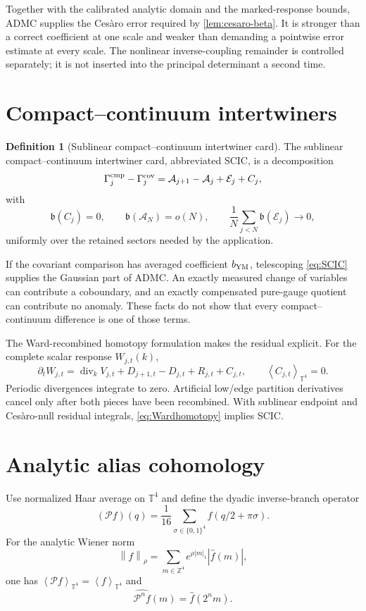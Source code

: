 \documentclass[11pt,oneside,openany]{book}
\theoremstyle{definition}
\newtheorem{definition}[definition]{Definition}
\theoremstyle{remark}
\newcommand{\Z}{\mathbb Z}
\newcommand{\T}{\mathbb T}
\newcommand{\norm}[1]{\left\lVert#1\right\rVert}
\newcommand{\avg}[1]{\left\langle#1\right\rangle_{\T^4}}
\newcommand{\src}[2]{\cite[#2]{#1}}
\begin{document}
Together with the calibrated analytic domain and the marked-response bounds, ADMC supplies the Ces\`aro error required by \cref{lem:cesaro-beta}. It is stronger than a correct coefficient at one scale and weaker than demanding a pointwise error estimate at every scale. The nonlinear inverse-coupling remainder is controlled separately; it is not inserted into the principal determinant a second time. \src{F9}{V13--V15}

\section{Compact--continuum intertwiners}
\begin{definition}[Sublinear compact--continuum intertwiner card]\label{def:SCIC}
The sublinear compact--continuum intertwiner card, abbreviated SCIC, is a decomposition
\begin{equation}\label{eq:SCIC}
\Gamma^{\rm cmp}_j-\Gamma^{\rm cov}_j
=\mathcal A_{j+1}-\mathcal A_j+\mathcal E_j+C_j,
\end{equation}
with
\[
\mathfrak b(C_j)=0,\qquad
\mathfrak b(\mathcal A_N)=o(N),\qquad
\frac1N\sum_{j<N}\mathfrak b(\mathcal E_j)\longrightarrow0,
\]
uniformly over the retained sectors needed by the application.
\end{definition}

If the covariant comparison has averaged coefficient $b_{\rm YM}$, telescoping \cref{eq:SCIC} supplies the Gaussian part of ADMC. An exactly measured change of variables can contribute a coboundary, and an exactly compensated pure-gauge quotient can contribute no anomaly. These facts do not show that every compact--continuum difference is one of those terms.

The Ward-recombined homotopy formulation makes the residual explicit. For the complete scalar response $W_{j,t}(k)$,
\begin{equation}\label{eq:Wardhomotopy}
\partial_tW_{j,t}
=\operatorname{div}_kV_{j,t}
+D_{j+1,t}-D_{j,t}+R_{j,t}+C_{j,t},
\qquad \avg{C_{j,t}}=0.
\end{equation}
Periodic divergences integrate to zero. Artificial low/edge partition derivatives cancel only after both pieces have been recombined. With sublinear endpoint and Ces\`aro-null residual integrals, \cref{eq:Wardhomotopy} implies SCIC. \src{F9}{V15--V16}

\section{Analytic alias cohomology}
Use normalized Haar average on $\T^4$ and define the dyadic inverse-branch operator
\begin{equation}\label{eq:alias-P}
(\mathcal Pf)(q)=\frac1{16}\sum_{\sigma\in\{0,1\}^4}
f(q/2+\pi\sigma).
\end{equation}
For the analytic Wiener norm
\[
\norm{f}_\rho=\sum_{m\in\Z^4}e^{\rho|m|_1}|\widehat f(m)|,
\]
one has $\avg{\mathcal Pf}=\avg f$ and
\begin{equation}\label{eq:Fourier-decimation}
\widehat{\mathcal P^nf}(m)=\widehat f(2^nm).
\end{equation}
\end{document}

